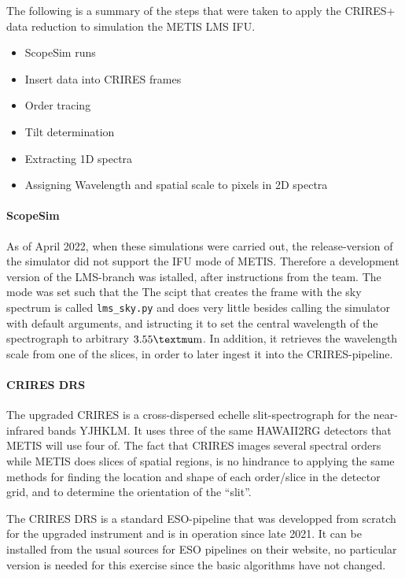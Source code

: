 The following is a summary of the steps that were taken to apply the
CRIRES+ data reduction to simulation the METIS LMS IFU.
\begin{itemize}
    \item ScopeSim runs
    \item Insert data into CRIRES frames
    \item Order tracing
    \item Tilt determination
    \item Extracting 1D spectra
    \item Assigning Wavelength and spatial scale to pixels in 2D spectra
\end{itemize}

\paragraph{ScopeSim}
As of April 2022, when these simulations were carried out, the
release-version of the simulator did not support the IFU mode of METIS.
Therefore a development version of the LMS-branch was istalled, after
instructions from the team. The mode was set such that the The scipt
that creates the frame with the sky spectrum is called
\texttt{lms\_sky.py} and does very little besides calling the simulator
with default arguments, and istructing it to set the central wavelength
of the spectrograph to arbitrary $3.55 \micron$. In addition, it retrieves
the wavelength scale from one of the slices, in order to later ingest it
into the CRIRES-pipeline.

\paragraph{CRIRES DRS}
The upgraded CRIRES is a cross-dispersed echelle slit-spectrograph for
the near-infrared bands YJHKLM. It uses three of the same HAWAII2RG
detectors that METIS will use four of. The fact that CRIRES images
several spectral orders while METIS does slices of spatial regions, is
no hindrance to applying the same methods for finding the location and
shape of each order/slice in the detector grid, and to determine the
orientation of the ``slit''.

The CRIRES DRS is a standard ESO-pipeline that was developped from
scratch for the upgraded instrument and is in operation since late 2021.
It can be installed from the usual sources for ESO pipelines on their
website, no particular version is needed for this exercise since the
basic algorithms have not changed.

